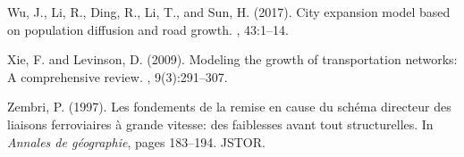 \documentclass[11pt]{article}
\begin{document}
\begin{thebibliography}{}
Wu, J., Li, R., Ding, R., Li, T., and Sun, H. (2017).
\newblock City expansion model based on population diffusion and road growth.
, 43:1--14.

Xie, F. and Levinson, D. (2009).
\newblock Modeling the growth of transportation networks: A comprehensive
  review.
, 9(3):291--307.

Zembri, P. (1997).
\newblock Les fondements de la remise en cause du sch{\'e}ma directeur des
  liaisons ferroviaires {\`a} grande vitesse: des faiblesses avant tout
  structurelles.
\newblock In {\em Annales de g{\'e}ographie}, pages 183--194. JSTOR.

\end{thebibliography}
\end{document}
